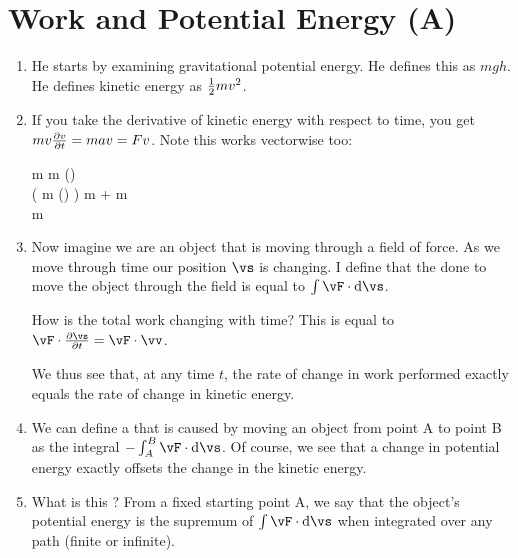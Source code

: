 \section{Work and Potential Energy (A)}

\begin{enumerate}

  \item He starts by examining gravitational potential energy. He
  defines this as $mgh$. He defines kinetic energy as $\half m v^2$.

  \item If you take the derivative of kinetic energy with respect to
  time, you get $mv \fpartial[v]{t} = mav = Fv$. Note this works
  vectorwise too:

  \begin{nedqn}
    \half m \normsq{\vv}
  \eqcol
    \half m (\vv \cdot \vv)
  \\
     \left(
      \half m (\vv \cdot \vv)
    \right)
  \eqcol
    \half m \vv \cdot \va
    +
    \half m \va \cdot \vv
  \\
  \eqcol
    m \va \cdot \vv
  \\
  \eqcol
    \vF \cdot \vv
  \end{nedqn}


  \item Now imagine we are an object that is moving through a field of
  force. As we move through time our position $\vs$ is changing. I
  define that the  done to move the object through the
  field is equal to $\int \vF \cdot \diff{\vs}$.

  How is the total work changing with time? This is equal to $\vF \cdot
  \fpartial[\vs]{t} = \vF \cdot \vv$.

  We thus see that, at any time $t$, the rate of change in work
  performed exactly equals the rate of change in kinetic energy.

  \item We can define a  that is
  caused by moving an object from point A to point B as the integral
  $-\int_A^B \vF \cdot \diff{\vs}$. Of course, we see that a change in
  potential energy exactly offsets the change in the kinetic energy.

  \item What is this ? From a fixed starting
  point A, we say that the object's potential energy is the supremum of
  $\int \vF \cdot \diff{\vs}$ when integrated over any path (finite or
  infinite).


\end{enumerate}

